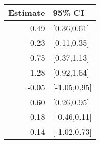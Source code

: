 \begin{tabular}{rl}
  \hline
Estimate & 95\% CI \\ 
  \hline
0.49 & [0.36,0.61] \\ 
  0.23 & [0.11,0.35] \\ 
  0.75 & [0.37,1.13] \\ 
  1.28 & [0.92,1.64] \\ 
  -0.05 & [-1.05,0.95] \\ 
  0.60 & [0.26,0.95] \\ 
  -0.18 & [-0.46,0.11] \\ 
  -0.14 & [-1.02,0.73] \\ 
   \hline
\end{tabular}

